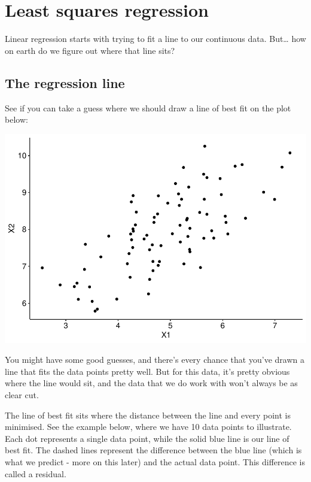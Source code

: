 \documentclass[
]{book}
\begin{document}
\hypertarget{least-squares-regression}{%
\section{Least squares regression}\label{least-squares-regression}}

Linear regression starts with trying to fit a line to our continuous data. But\ldots{} how on earth do we figure out where that line sits?

\hypertarget{the-regression-line}{%
\subsection{The regression line}\label{the-regression-line}}

See if you can take a guess where we should draw a line of best fit on the plot below:

\begin{center}\includegraphics{_main_files/figure-latex/unnamed-chunk-189-1} \end{center}

You might have some good guesses, and there's every chance that you've drawn a line that fits the data points pretty well. But for this data, it's pretty obvious where the line would sit, and the data that we do work with won't always be as clear cut.

The line of best fit sits where the distance between the line and every point is minimised. See the example below, where we have 10 data points to illustrate. Each dot represents a single data point, while the solid blue line is our line of best fit. The dashed lines represent the difference between the blue line (which is what we predict - more on this later) and the actual data point. This difference is called a residual.
\end{document}
